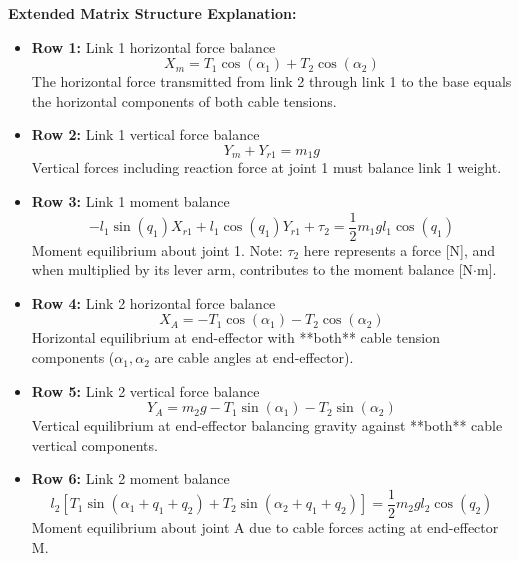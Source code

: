 \textbf{Extended Matrix Structure Explanation:}

\begin{itemize}
    \item \textbf{Row 1:} Link 1 horizontal force balance
    \begin{equation}
    X_m = T_1 \cos(\alpha_1) + T_2 \cos(\alpha_2)
    \end{equation}
    The horizontal force transmitted from link 2 through link 1 to the base equals the horizontal components of both cable tensions.
    
    \item \textbf{Row 2:} Link 1 vertical force balance  
    \begin{equation}
    Y_m + Y_{r1} = m_1 g
    \end{equation}
    Vertical forces including reaction force at joint 1 must balance link 1 weight.
    
    \item \textbf{Row 3:} Link 1 moment balance
    \begin{equation}
    -l_1\sin(q_1) X_{r1} + l_1\cos(q_1) Y_{r1} + \tau_2 = \frac{1}{2} m_1 g l_1 \cos(q_1)
    \end{equation}
    Moment equilibrium about joint 1. Note: $\tau_2$ here represents a force [N], and when multiplied by its lever arm, contributes to the moment balance [N$\cdot$m].
    
    \item \textbf{Row 4:} Link 2 horizontal force balance
    \begin{equation}
    X_A = -T_1 \cos(\alpha_1) - T_2 \cos(\alpha_2)
    \end{equation}
    Horizontal equilibrium at end-effector with **both** cable tension components ($\alpha_1, \alpha_2$ are cable angles at end-effector).
    
    \item \textbf{Row 5:} Link 2 vertical force balance
    \begin{equation}
    Y_A = m_2 g - T_1 \sin(\alpha_1) - T_2 \sin(\alpha_2)
    \end{equation}
    Vertical equilibrium at end-effector balancing gravity against **both** cable vertical components.
    
    \item \textbf{Row 6:} Link 2 moment balance
    \begin{equation}
    l_2[T_1 \sin(\alpha_1 + q_1 + q_2) + T_2 \sin(\alpha_2 + q_1 + q_2)] = \frac{1}{2} m_2 g l_2 \cos(q_2)
    \end{equation}
    Moment equilibrium about joint A due to cable forces acting at end-effector M.
    

\end{itemize}
